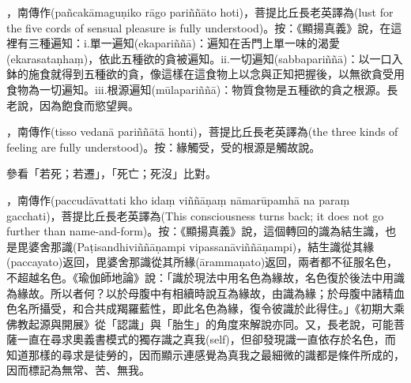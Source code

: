 \startitemgroup[noteitems]
\item{}，南傳作(pañcakāmaguṇiko rāgo pariññāto hoti)，菩提比丘長老英譯為(lust for the five cords of sensual pleasure is fully understood)。按：《顯揚真義》說，在這裡有三種遍知：i.單一遍知(ekapariññā)：遍知在舌門上單一味的渴愛(ekarasataṇhaṃ)，依此五種欲的貪被遍知。ii.一切遍知(sabbapariññā)：以一口入鉢的施食就得到五種欲的貪，像這樣在這食物上以念與正知把握後，以無欲貪受用食物為一切遍知。iii.根源遍知(mūlapariññā)：物質食物是五種欲的貪之根源。長老說，因為飽食而慾望興。
\stopitemgroup

\startitemgroup[noteitems]
\item{}，南傳作(tisso vedanā pariññātā honti)，菩提比丘長老英譯為(the three kinds of feeling are fully understood)。按：緣觸受，受的根源是觸故說。
\stopitemgroup

\startitemgroup[noteitems]
\item{}參看「若死；若遷」，「死亡；死沒」比對。
\stopitemgroup

\startitemgroup[noteitems]
\item{}，南傳作(paccudāvattati kho idaṃ viññāṇaṃ nāmarūpamhā na paraṃ gacchati)，菩提比丘長老英譯為(This consciousness turns back; it does not go further than name-and-form)。按：《顯揚真義》說，這個轉回的識為結生識，也是毘婆舍那識(Paṭisandhiviññāṇampi vipassanāviññāṇampi)，結生識從其緣(paccayato)返回，毘婆舍那識從其所緣(ārammaṇato)返回，兩者都不征服名色，不超越名色。《瑜伽師地論》說：「識於現法中用名色為緣故，名色復於後法中用識為緣故。所以者何？以於母腹中有相續時說互為緣故，由識為緣；於母腹中諸精血色名所攝受，和合共成羯羅藍性，即此名色為緣，復令彼識於此得住。」《初期大乘佛教起源與開展》從「認識」與「胎生」的角度來解說亦同。又，長老說，可能菩薩一直在尋求奧義書模式的獨存識之真我(self)，但卻發現識一直依存於名色，而知道那樣的尋求是徒勞的，因而顯示連感覺為真我之最細微的識都是條件所成的，因而標記為無常、苦、無我。
\stopitemgroup

